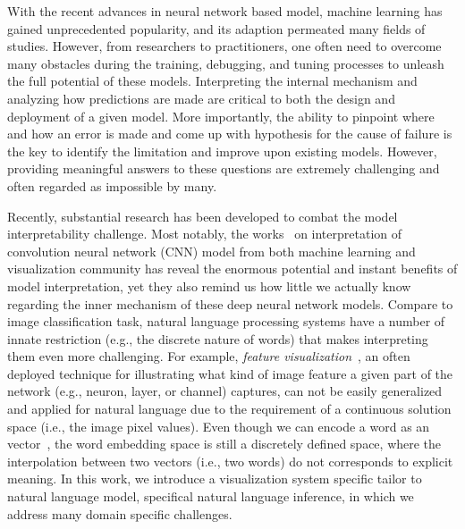 \maketitle

With the recent advances in neural network based model, machine learning has gained unprecedented popularity, and its adaption permeated many fields of studies.
%
However, from researchers to practitioners, one often need to overcome many obstacles during the training, debugging, and tuning processes to unleash the full potential of these models.
%
Interpreting the internal mechanism and analyzing how predictions are made are critical to both the design and deployment of a given model.
More importantly, the ability to pinpoint where and how an error is made and come up with hypothesis for the cause of failure is the key to identify the limitation and improve upon existing models.
However, providing meaningful answers to these questions are extremely challenging and often regarded as impossible by many.

Recently, substantial research has been developed to combat the model interpretability challenge. Most notably, the works~\cite{} on interpretation of convolution neural network (CNN) model from both machine learning and visualization community has reveal the enormous potential and instant benefits of model interpretation, yet they also remind us how little we actually know regarding the inner mechanism of these deep neural network models.
%
Compare to image classification task, natural language processing systems have a number of innate restriction (e.g., the discrete nature of words) that makes interpreting them even more challenging. For example, \emph{feature visualization}~\cite{}, an often deployed technique for illustrating what kind of image feature a given part of the network (e.g., neuron, layer, or channel) captures, can not be easily generalized and applied for natural language due to the requirement of a continuous solution space (i.e., the image pixel values). Even though we can encode a word as an vector~\cite{}, the word embedding space is still a discretely defined space, where the interpolation between two vectors (i.e., two words) do not corresponds to explicit meaning.
%
In this work, we introduce a visualization system specific tailor to natural language model, specifical natural language inference, in which we address many domain specific challenges.

